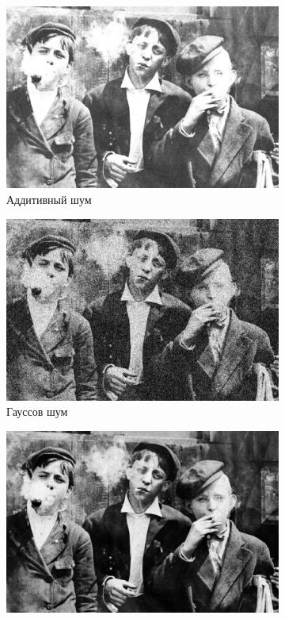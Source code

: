 \begin{figure}[ht]
\begin{subfigure}[b]{0.5\linewidth}
      \includegraphics[width=0.95\linewidth]{../Gaussian_Blur/Gaussian_Blur_Additive_noise_(3,3).jpg} 
      \caption{Аддитивный шум} 
      \label{gaussian_3:c} 
      \vspace{4ex}
    \end{subfigure}%
    \begin{subfigure}[b]{0.5\linewidth}
      \centering
      \includegraphics[width=0.95\linewidth]{../Gaussian_Blur/Gaussian_Blur_Gaussian_noise_(3,3).jpg} 
      \caption{Гауссов шум} 
      \label{gaussian_3:d} 
      \vspace{4ex}
    \end{subfigure}
    \begin{subfigure}[b]{0.5\linewidth}
      \centering
      \includegraphics[width=0.95\linewidth]{../Gaussian_Blur/Gaussian_Blur_Poisson_noise_(3,3).jpg} 

\end{subfigure}
\end{figure}
